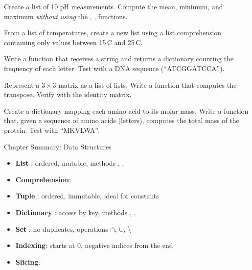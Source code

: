 \begin{exercise}
Create a list of 10 pH measurements. Compute the mean, minimum, and maximum
\emph{without using} the , ,  functions.
\end{exercise}

\begin{exercise}
From a list of temperatures, create a new list using a list comprehension
containing only values between 15\,\textdegree C and 25\,\textdegree C.
\end{exercise}

\begin{exercise}
Write a function that receives a string and returns a dictionary
counting the frequency of each letter. Test with a DNA sequence
(``ATCGGATCCA'').
\end{exercise}

\begin{exercise}
Represent a $3\times 3$ matrix as a list of lists. Write a function
that computes the transpose. Verify with the identity matrix.
\end{exercise}

\begin{exercise}
Create a dictionary mapping each amino acid to its molar mass.
Write a function that, given a sequence of amino acids (letters),
computes the total mass of the protein. Test with ``MKVLWA''.
\end{exercise}

\begin{keyformulas}{Chapter Summary: Data Structures}
\begin{itemize}
    \item \textbf{List} \py{[...]}: ordered, mutable, methods ,
    , 
    \item \textbf{Comprehension}: 
    \item \textbf{Tuple} : ordered, immutable, ideal for constants
    \item \textbf{Dictionary} : access by key, methods
    , , 
    \item \textbf{Set} : no duplicates, operations $\cap$, $\cup$, $\setminus$
    \item \textbf{Indexing}: starts at 0, negative indices from the end
    \item \textbf{Slicing}: 
\end{itemize}
\end{keyformulas}
